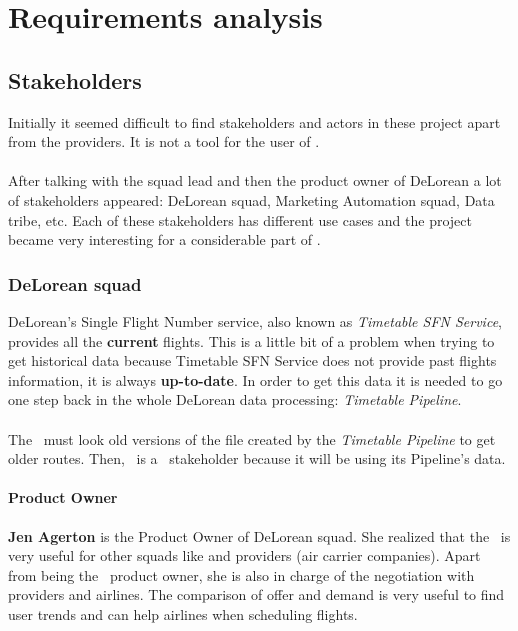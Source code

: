 
\chapter{Requirements analysis}

\label{chapter04}


\section{Stakeholders}

Initially it seemed difficult to find stakeholders and actors in these project apart from the providers. It is not a tool for the user of \company.
\\\\
After talking with the squad lead and then the product owner of DeLorean a lot of stakeholders appeared: DeLorean squad, Marketing Automation squad, Data tribe, etc. Each of these stakeholders has different use cases and the project became very interesting for a considerable part of \company.

\subsection{DeLorean squad} \label{dlr}

DeLorean's Single Flight Number service, also known as \textit{Timetable SFN Service}, provides all the \textbf{current} flights. This is a little bit of a problem when trying to get historical data because Timetable SFN Service does not provide past flights information, it is always \textbf{up-to-date}. In order to get this data it is needed to go one step back in the whole DeLorean data processing: \textit{Timetable Pipeline}.
\\\\
The \thesis\ must look old versions of the file created by the \textit{Timetable Pipeline} to get older routes. Then, \squad\ is a \thesis\ stakeholder because it will be using its Pipeline's data.

\subsubsection*{Product Owner} \label{product_owner}

\textbf{Jen Agerton} is the Product Owner of DeLorean squad. She realized that the \thesis\ is very useful for other squads like  and providers (air carrier companies). Apart from being the \squad\ product owner, she is also in charge of the negotiation with providers and airlines. The comparison of offer and demand is very useful to find user trends and can help airlines when scheduling flights.


